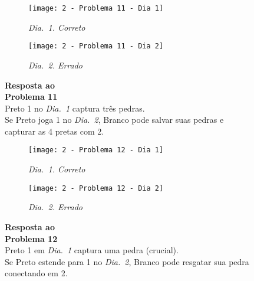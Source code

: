 \vfill

\begin{SCfigure}[][h!]
    \begin{subfigure}[t]{.31\textwidth}
        \texttt{[image: 2 - Problema 11 - Dia 1]}
        \caption*{\emph{Dia.\@~1. Correto}}
    \end{subfigure}
    \hfill
    \begin{subfigure}[t]{.31\textwidth}
        \texttt{[image: 2 - Problema 11 - Dia 2]}
        \caption*{\emph{Dia.\@~2. Errado}}
    \end{subfigure}
    \hfill
    \caption*{\textbf{Resposta ao\\Problema 11}\\\vspace*{.25cm}Preto 1 no \emph{Dia.\@~1} captura três pedras.\\\vspace*{.25cm}Se Preto joga 1 no \emph{Dia.\@~2}, Branco pode salvar suas pedras e capturar as 4 pretas com 2.}
\end{SCfigure}

\vfill

\begin{SCfigure}[][h!]
    \begin{subfigure}[t]{.31\textwidth}
        \texttt{[image: 2 - Problema 12 - Dia 1]}
        \caption*{\emph{Dia.\@~1. Correto}}
    \end{subfigure}
    \hfill
    \begin{subfigure}[t]{.31\textwidth}
        \texttt{[image: 2 - Problema 12 - Dia 2]}
        \caption*{\emph{Dia.\@~2. Errado}}
    \end{subfigure}
    \hfill
    \caption*{\textbf{Resposta ao\\Problema 12}\\\vspace*{.25cm}Preto 1 em \emph{Dia.\@~1} captura uma pedra (crucial).\\\vspace*{.25cm}Se Preto estende para 1 no \emph{Dia.\@~2}, Branco pode resgatar sua pedra conectando em 2.}
\end{SCfigure}

\pagebreak

